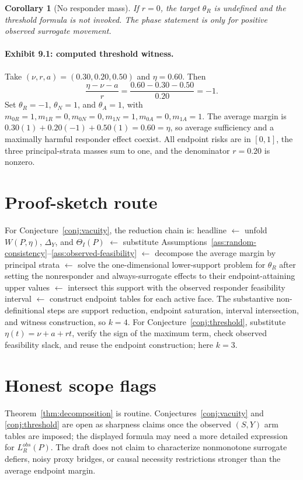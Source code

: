 \documentclass[11pt]{article}
\theoremstyle{definition}
\theoremstyle{plain}
\newtheorem{corollary}{Corollary}
\theoremstyle{remark}
\begin{document}
\begin{corollary}[No responder mass]\label{cor:no-responder}
If \(r=0\), the target \(\theta_R\) is undefined and the threshold formula is not invoked.  The phase statement is only for positive observed surrogate movement.
\end{corollary}

\paragraph{Exhibit 9.1: computed threshold witness.}
Take \((\nu,r,a)=(0.30,0.20,0.50)\) and \(\eta=0.60\).  Then
\[
  \frac{\eta-\nu-a}{r}=\frac{0.60-0.30-0.50}{0.20}=-1.
\]
Set \(\theta_R=-1\), \(\theta_N=1\), and \(\theta_A=1\), with \(m_{0R}=1,m_{1R}=0,m_{0N}=0,m_{1N}=1,m_{0A}=0,m_{1A}=1\).  The average margin is \(0.30(1)+0.20(-1)+0.50(1)=0.60=\eta\), so average sufficiency and a maximally harmful responder effect coexist.  All endpoint risks are in \([0,1]\), the three principal-strata masses sum to one, and the denominator \(r=0.20\) is nonzero.

\section{Proof-sketch route}
For Conjecture~\ref{conj:vacuity}, the reduction chain is: headline \(\leftarrow\) unfold \(W(P,\eta)\), \(\Delta_Y\), and \(\Theta_I(P)\) \(\leftarrow\) substitute Assumptions~\ref{ass:random-consistency}--\ref{ass:observed-feasibility} \(\leftarrow\) decompose the average margin by principal strata \(\leftarrow\) solve the one-dimensional lower-support problem for \(\theta_R\) after setting the nonresponder and always-surrogate effects to their endpoint-attaining upper values \(\leftarrow\) intersect this support with the observed responder feasibility interval \(\leftarrow\) construct endpoint tables for each active face.  The substantive non-definitional steps are support reduction, endpoint saturation, interval intersection, and witness construction, so \(k=4\).  For Conjecture~\ref{conj:threshold}, substitute \(\eta(t)=\nu+a+rt\), verify the sign of the maximum term, check observed feasibility slack, and reuse the endpoint construction; here \(k=3\).

\section{Honest scope flags}
Theorem~\ref{thm:decomposition} is routine.  Conjectures~\ref{conj:vacuity} and \ref{conj:threshold} are open as sharpness claims once the observed \((S,Y)\) arm tables are imposed; the displayed formula may need a more detailed expression for \(L_R^{obs}(P)\).  The draft does not claim to characterize nonmonotone surrogate defiers, noisy proxy bridges, or causal necessity restrictions stronger than the average endpoint margin.
\end{document}
